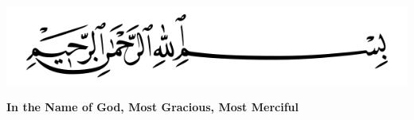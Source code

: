 \thispagestyle{empty}
\section*{}
\vspace{40ex}

\begin{center}
\includegraphics[width=150mm]{util/figures/basmalah.png}

\textbf{In the Name of God, Most Gracious, Most Merciful}

\end{center}